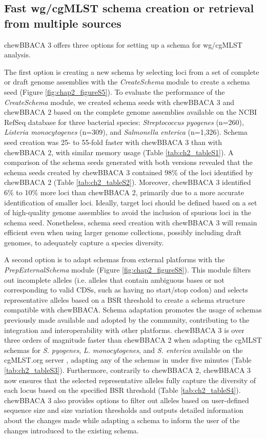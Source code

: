\subsection{Fast wg/cgMLST schema creation or retrieval from multiple sources} \label{ssec:ch2_results_discussion_ssec1}

chewBBACA 3 offers three options for setting up a schema for \ac{wg/cgMLST} analysis.

The first option is creating a new schema by selecting loci from a set of complete or draft genome assemblies with the \textit{CreateSchema} module to create a schema seed (Figure \ref{fig:chap2_figureS5}). To evaluate the performance of the \textit{CreateSchema} module, we created schema seeds with chewBBACA 3 and chewBBACA 2 based on the complete genome assemblies available on the \ac{NCBI} RefSeq database \citep{sayers_database_2022} for three bacterial species: \textit{Streptococcus pyogenes} (n=260), \textit{Listeria monocytogenes} (n=309), and \textit{Salmonella enterica} (n=1,326). Schema seed creation was 25- to 55-fold faster with chewBBACA 3 than with chewBBACA 2, with similar memory usage (Table \ref{tab:ch2_tableS1}). A comparison of the schema seeds generated with both versions revealed that the schema seeds created by chewBBACA 3 contained 98\% of the loci identified by chewBBACA 2 (Table \ref{tab:ch2_tableS2}). Moreover, chewBBACA 3 identified 6\% to 10\% more loci than chewBBACA 2, primarily due to a more accurate identification of smaller loci. Ideally, target loci should be defined based on a set of high-quality genome assemblies to avoid the inclusion of spurious loci in the schema seed. Nonetheless, schema seed creation with chewBBACA 3 will remain efficient even when using larger genome collections, possibly including draft genomes, to adequately capture a species diversity.

A second option is to adapt schemas from external platforms with the \textit{PrepExternalSchema} module (Figure \ref{fig:chap2_figureS8}). This module filters out incomplete alleles (i.e. alleles that contain ambiguous bases or not corresponding to valid \ac{CDSs}, such as having no start/stop codon) and selects representative alleles based on a \ac{BSR} threshold to create a schema structure compatible with chewBBACA. Schema adaptation promotes the usage of schemas previously made available and adopted by the community, contributing to the integration and interoperability with other platforms. chewBBACA 3 is over three orders of magnitude faster than chewBBACA 2 when adapting the \ac{cgMLST} schemas for \textit{S. pyogenes}, \textit{L. monocytogenes}, and \textit{S. enterica} available on the cgMLST.org server \citep{noauthor_cgmlstorg_nodate}, adapting any of the schemas in under five minutes (Table \ref{tab:ch2_tableS3}). Furthermore, contrarily to chewBBACA 2, chewBBACA 3 now ensures that the selected representative alleles fully capture the diversity of each locus based on the specified \ac{BSR} threshold (Table \ref{tab:ch2_tableS4}). chewBBACA 3 also provides options to filter out alleles based on user-defined sequence size and size variation thresholds and outputs detailed information about the changes made while adapting a schema to inform the user of the changes introduced to the existing schema.

